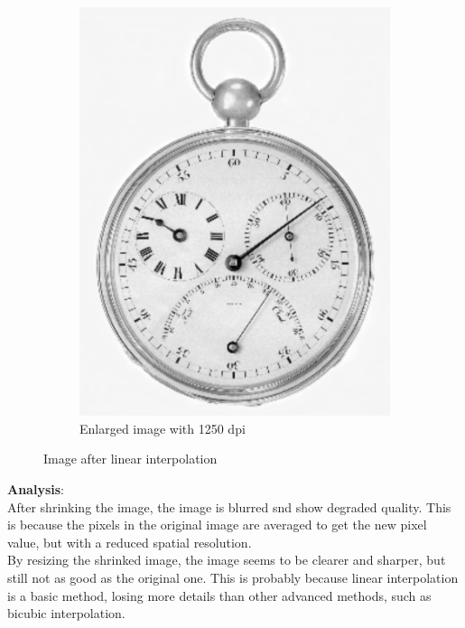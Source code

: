 \documentclass[UTF8]{ctexart}
\begin{document}
\begin{figure}[htbp]
\begin{subfigure}{0.3\textwidth}
        \includegraphics[width=\linewidth]{shrinked_zoomed_image.jpg}
        \caption{Enlarged image with 1250 dpi}
    \end{subfigure}

    \caption{Image after linear interpolation}
\end{figure}

\textbf{Analysis}:\\
After shrinking the image, the image is blurred snd show degraded quality. 
This is because the pixels in the original image are averaged to get the new pixel value, but with a reduced spatial resolution.\\
By resizing the shrinked image, the image seems to be clearer and sharper, but still not as good as the original one.
This is probably because linear interpolation is a basic method, losing more details than other advanced methods, such 
as bicubic interpolation.\\
\end{document}

